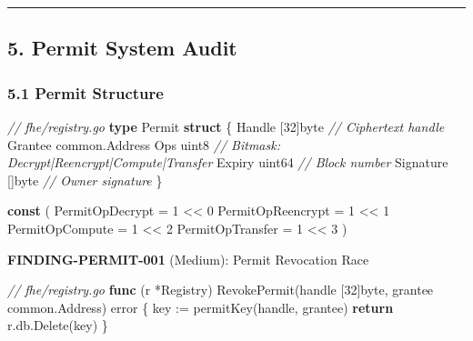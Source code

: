 \documentclass[
]{article}
\newenvironment{Shaded}{}{}
\newcommand{\CommentTok}[1]{\textcolor[rgb]{0.38,0.63,0.69}{\textit{#1}}}
\newcommand{\ControlFlowTok}[1]{\textcolor[rgb]{0.00,0.44,0.13}{\textbf{#1}}}
\newcommand{\DataTypeTok}[1]{\textcolor[rgb]{0.56,0.13,0.00}{#1}}
\newcommand{\DecValTok}[1]{\textcolor[rgb]{0.25,0.63,0.44}{#1}}
\newcommand{\KeywordTok}[1]{\textcolor[rgb]{0.00,0.44,0.13}{\textbf{#1}}}
\newcommand{\NormalTok}[1]{#1}
\newcommand{\OperatorTok}[1]{\textcolor[rgb]{0.40,0.40,0.40}{#1}}
\begin{document}
\begin{center}\rule{0.5\linewidth}{0.5pt}\end{center}

\subsection{5. Permit System Audit}\label{5-permit-system-audit}

\subsubsection{5.1 Permit Structure}\label{51-permit-structure}

\begin{Shaded}
\begin{Highlighting}[]
\CommentTok{// fhe/registry.go}
\KeywordTok{type}\NormalTok{ Permit }\KeywordTok{struct} \OperatorTok{\{}
\NormalTok{    Handle    }\OperatorTok{[}\DecValTok{32}\OperatorTok{]}\DataTypeTok{byte}      \CommentTok{// Ciphertext handle}
\NormalTok{    Grantee   common}\OperatorTok{.}\NormalTok{Address}
\NormalTok{    Ops       }\DataTypeTok{uint8}         \CommentTok{// Bitmask: Decrypt|Reencrypt|Compute|Transfer}
\NormalTok{    Expiry    }\DataTypeTok{uint64}        \CommentTok{// Block number}
\NormalTok{    Signature }\OperatorTok{[]}\DataTypeTok{byte}        \CommentTok{// Owner signature}
\OperatorTok{\}}

\KeywordTok{const} \OperatorTok{(}
\NormalTok{    PermitOpDecrypt   }\OperatorTok{=} \DecValTok{1} \OperatorTok{\textless{}\textless{}} \DecValTok{0}
\NormalTok{    PermitOpReencrypt }\OperatorTok{=} \DecValTok{1} \OperatorTok{\textless{}\textless{}} \DecValTok{1}
\NormalTok{    PermitOpCompute   }\OperatorTok{=} \DecValTok{1} \OperatorTok{\textless{}\textless{}} \DecValTok{2}
\NormalTok{    PermitOpTransfer  }\OperatorTok{=} \DecValTok{1} \OperatorTok{\textless{}\textless{}} \DecValTok{3}
\OperatorTok{)}
\end{Highlighting}
\end{Shaded}

\textbf{FINDING-PERMIT-001} (Medium): Permit Revocation Race

\begin{Shaded}
\begin{Highlighting}[]
\CommentTok{// fhe/registry.go}
\KeywordTok{func} \OperatorTok{(}\NormalTok{r }\OperatorTok{*}\NormalTok{Registry}\OperatorTok{)}\NormalTok{ RevokePermit}\OperatorTok{(}\NormalTok{handle }\OperatorTok{[}\DecValTok{32}\OperatorTok{]}\DataTypeTok{byte}\OperatorTok{,}\NormalTok{ grantee common}\OperatorTok{.}\NormalTok{Address}\OperatorTok{)} \DataTypeTok{error} \OperatorTok{\{}
\NormalTok{    key }\OperatorTok{:=}\NormalTok{ permitKey}\OperatorTok{(}\NormalTok{handle}\OperatorTok{,}\NormalTok{ grantee}\OperatorTok{)}
    \ControlFlowTok{return}\NormalTok{ r}\OperatorTok{.}\NormalTok{db}\OperatorTok{.}\NormalTok{Delete}\OperatorTok{(}\NormalTok{key}\OperatorTok{)}
\OperatorTok{\}}
\end{Highlighting}
\end{Shaded}
\end{document}
